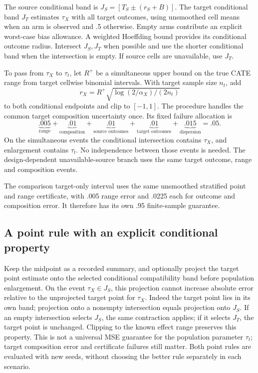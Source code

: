 The source conditional band is $J_S=[T_S\pm(r_S+B)]$.
The target conditional band $J_T$ estimates $\tau_X$ with all target outcomes,
using unsmoothed cell means when an arm is observed and .5 otherwise. Empty
arms contribute an explicit worst-case bias allowance. A weighted Hoeffding
bound provides its conditional outcome radius.
Intersect $J_S,J_T$ when possible and use the shorter conditional band when
the intersection is empty. If source cells are unavailable, use $J_T$.

To pass from $\tau_X$ to $\tau_t$, let $R^+$ be a simultaneous upper bound
on the true CATE range from target cellwise binomial intervals. With target
sample size $n_t$, add
\[
 r_X=R^+\sqrt{\log(2/\alpha_X)/(2n_t)}
\]
to both conditional endpoints and clip to $[-1,1]$.
The procedure handles the common target composition uncertainty once.
Its fixed failure allocation is
\[
 \underbrace{.005}_{\text{range}}+
 \underbrace{.01}_{\text{composition}}+
 \underbrace{.01}_{\text{source outcomes}}+
 \underbrace{.01}_{\text{target outcomes}}+
 \underbrace{.015}_{\text{dispersion}}=.05.
\]
On the simultaneous events the conditional intersection contains $\tau_X$,
and enlargement contains $\tau_t$. No independence between those events is
needed. The design-dependent unavailable-source branch uses the same target
outcome, range and composition events.

The comparison target-only interval uses the same unsmoothed stratified point
and range certificate, with .005 range error and .0225 each for outcome and
composition error. It therefore has its own .95 finite-sample guarantee.

\subsection{A point rule with an explicit conditional property}

Keep the midpoint as a recorded summary, and optionally project the target
point estimate onto the selected conditional compatibility band before
population enlargement. On the event $\tau_X\in J_S$, this projection cannot
increase absolute error relative to the unprojected target point for $\tau_X$.
Indeed the target point lies in its own band; projection onto a nonempty
intersection equals projection onto $J_S$. If an empty intersection selects
$J_S$, the same contraction applies; if it selects $J_T$, the target point
is unchanged. Clipping to the known effect range preserves this property.
This is not a universal MSE guarantee for the population parameter $\tau_t$;
target composition error and certificate failures still matter. Both point
rules are evaluated with new seeds, without choosing the better rule separately
in each scenario.

